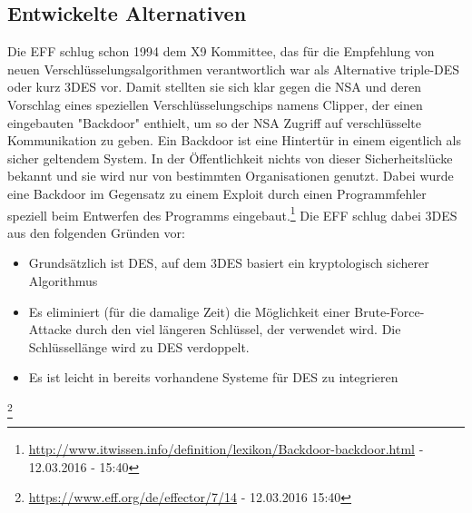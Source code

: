 \documentclass[
10pt, %
a4paper, %
oneside, %
headinclude,footinclude, %
BCOR5mm, %
]{scrartcl}
\begin{document}
\subsection{Entwickelte Alternativen} 
Die EFF schlug schon 1994 dem X9 Kommittee, das für die Empfehlung von neuen Verschlüsselungsalgorithmen verantwortlich war als Alternative triple-DES oder kurz 3DES vor. Damit stellten sie sich klar gegen die NSA und deren Vorschlag eines speziellen Verschlüsselungschips namens Clipper, der einen eingebauten "Backdoor" enthielt, um so der NSA Zugriff auf verschlüsselte Kommunikation zu geben. Ein Backdoor ist eine Hintertür in einem eigentlich als sicher geltendem System. In der Öffentlichkeit nichts von dieser Sicherheitslücke bekannt und sie wird nur von bestimmten Organisationen genutzt. Dabei wurde eine Backdoor im Gegensatz zu einem Exploit durch einen Programmfehler speziell beim Entwerfen des Programms eingebaut.\footnote{\url{http://www.itwissen.info/definition/lexikon/Backdoor-backdoor.html} - 12.03.2016 - 15:40} 
Die EFF schlug dabei 3DES aus den folgenden Gründen vor: 
\begin{itemize}
\item Grundsätzlich ist DES, auf dem 3DES basiert ein kryptologisch sicherer Algorithmus
\item Es eliminiert (für die damalige Zeit) die Möglichkeit einer Brute-Force-Attacke durch den viel längeren Schlüssel, der verwendet wird. Die Schlüssellänge wird zu DES verdoppelt.
\item Es ist leicht in bereits vorhandene Systeme für  DES zu integrieren
\end{itemize} 
\footnote{\url{https://www.eff.org/de/effector/7/14} - 12.03.2016 15:40}
\end{document}
